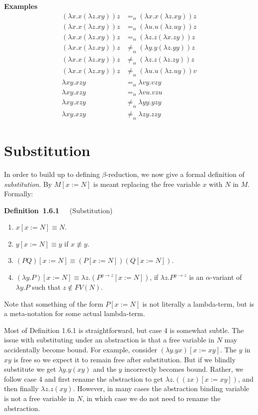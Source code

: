 \documentclass[letterpaper]{article}
\newenvironment{examplesNonNum}[1][]{\par\medskip
	\noindent \textbf{Examples}~~~#1 \rmfamily}{\medskip}
\newenvironment{definition}[2][]{\par\medskip
	\noindent \textbf{Definition~#2}~~~#1 \rmfamily}{\medskip}
\renewcommand{\l}{\lambda}
\newcommand{\aeq}{=_\alpha}
\newcommand{\naeq}{\neq_\alpha}
\begin{document}
\begin{examplesNonNum}
\begin{align*}
	(\l x. x(\l z. x y)) z &\aeq (\l x. x(\l z. x y)) z \\
	(\l x. x(\l z. x y)) z &\aeq (\l u. u(\l z. u y)) z \\
	(\l x. x(\l z. x y)) z &\aeq (\l z. z(\l x. z y)) z \\
	(\l x. x(\l z. x y)) z &\naeq (\l y. y(\l z. y y)) z \\
	(\l x. x(\l z. x y)) z &\naeq (\l z. z(\l z. z y)) z \\
	(\l x. x(\l z. x y)) z &\naeq (\l u. u(\l z. u y)) v \\
	\l x y. x z y &\aeq \l v y. v z y \\
	\l x y. x z y &\aeq \l v u. v z u \\
	\l x y. x z y &\naeq \l y y. y z y \\
	\l x y. x z y &\naeq \l z y. z z y
\end{align*}
\end{examplesNonNum}

\section{Substitution}
In order to build up to defining $\beta$-reduction, we now give a formal definition of \emph{substitution}. By $M[x:= N]$ is meant replacing the free variable $x$ with $N$ in $M$. Formally:

\begin{definition}[(Substitution)]{1.6.1}
	\begin{enumerate}
		\item $x[x := N] \equiv N$.
		\item $y[x := N] \equiv y$ if $x \not \equiv y$.
		\item $(PQ)[x := N] \equiv (P[x := N])(Q[x := N])$.
		\item $(\l y. P)[x := N] \equiv \l z . (P^{y \to z}[x := N])$, if $\l z. P^{y \to z}$ is an $\alpha$-variant of $\l y . P$ such that $z \not \in FV(N)$.
	\end{enumerate}
	Note that something of the form $P[x := N]$ is not literally a lambda-term, but is a meta-notation for some actual lambda-term.
\end{definition}

Most of Definition 1.6.1 is straightforward, but case 4 is somewhat subtle.  The issue with substituting under an abstraction is that a free variable in $N$ may accidentally become bound. For example, consider $(\l y. y x)[x := x y]$. The $y$ in $x y$ is free so we expect it to remain free after substitution. But if we blindly substitute we get $\l y . y (xy)$ and the $y$ incorrectly becomes bound. Rather, we follow case 4 and first rename the abstraction to get $\l z . ((z x)[x := xy])$, and then finally $\l z.z (x y)$. However, in many cases the abstraction binding variable is not a free variable in $N$, in which case we do not need to rename the abstraction.
\end{document}
